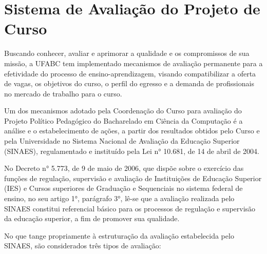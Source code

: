 \section {Sistema de Avaliação do Projeto de Curso}

Buscando conhecer, avaliar e aprimorar a qualidade e os compromissos de sua missão, a
UFABC tem implementado mecanismos de avaliação permanente para a efetividade do processo de ensino-aprendizagem, visando compatibilizar a oferta de vagas, os objetivos do curso, o perfil do egresso e a demanda de profissionais no mercado de trabalho para o curso.

Um dos mecanismos adotado pela Coordenação do Curso para avaliação do Projeto
Político Pedagógico do Bacharelado em Ciência da Computação é a análise e o
estabelecimento de ações, a partir dos resultados obtidos pelo Curso e pela Universidade no
Sistema Nacional de Avaliação da Educação Superior (SINAES), regulamentado e instituído
pela Lei n° 10.681, de 14 de abril de 2004.

No Decreto n° 5.773, de 9 de maio de 2006, que dispõe sobre o exercício das funções de
regulação, supervisão e avaliação de Instituições de Educação Superior (IES) e Cursos
superiores de Graduação e Sequenciais no sistema federal de ensino, no seu artigo 1°,
parágrafo 3°, lê-se que a avaliação realizada pelo SINAES constitui referencial básico para os
processos de regulação e supervisão da educação superior, a fim de promover sua qualidade.

No que tange propriamente à estruturação da avaliação estabelecida pelo SINAES, são
considerados três tipos de avaliação:

